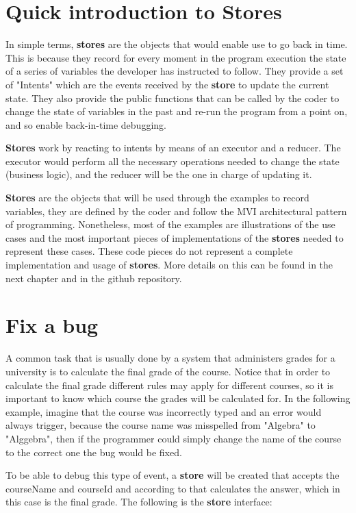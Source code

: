 \section{Quick introduction to Stores}

In simple terms, \textbf{stores} are the objects that would enable use to go back in time. This is because they record for every moment in the program execution the state of a series of variables the developer has instructed to follow. They provide a set of "Intents" which are the events received by the \textbf{store} to update the current state. They also provide the public functions that can be called by the coder to change the state of variables in the past and re-run the program from a point on, and so enable back-in-time debugging.

\textbf{Stores} work by reacting to intents by means of an executor and a reducer. The executor would perform all the necessary operations needed to change the state (business logic), and the reducer will be the one in charge of updating it.

\textbf{Stores} are the objects that will be used through the examples to record variables, they are defined by the coder and follow the MVI architectural pattern of programming. Nonetheless, most of the examples are illustrations of the use cases and the most important pieces of implementations of the \textbf{stores} needed to represent these cases. These code pieces do not represent a complete implementation and usage of \textbf{stores}. More details on this can be found in the next chapter and in the github repository.

\section{Fix a bug}

A common task that is usually done by a system that administers grades for a university is to calculate the final grade of the course. Notice that in order to calculate the final grade different rules may apply for different courses, so it is important to know which course the grades will be calculated for. In the following example, imagine that the course was incorrectly typed and an error would always trigger, because the course name was misspelled from "Algebra" to "Alggebra", then if the programmer could simply change the name of the course to the correct one the bug would be fixed.

To be able to debug this type of event, a \textbf{store} will be created that accepts the courseName and courseId and according to that calculates the answer, which in this case is the final grade. The following is the \textbf{store} interface:


